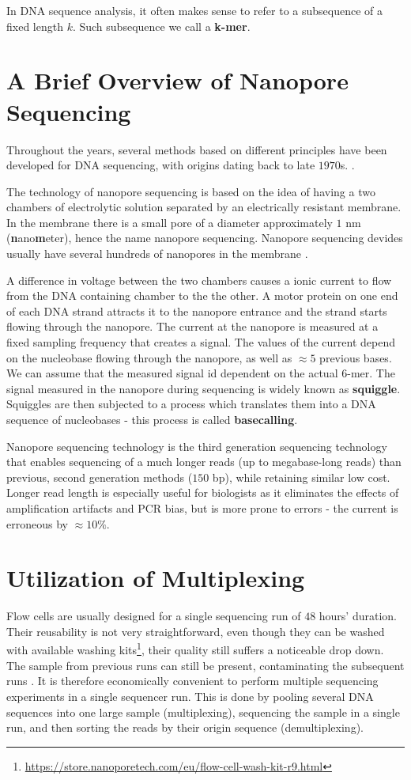 In DNA sequence analysis, it often makes sense to refer to a subsequence of a fixed length \(k\). Such subsequence we call a \textbf{k-mer}.

\section{A Brief Overview of Nanopore Sequencing}
Throughout the years, several methods based on different principles have been developed for DNA sequencing, with origins dating back to late $1970$s.  \cite{ambardar2016high}.

The technology of nanopore sequencing is based on the idea of having a two chambers of electrolytic solution separated by an electrically resistant membrane. In the membrane there is a small pore of a diameter approximately $1$ nm (\textbf{n}ano\textbf{m}eter), hence the name nanopore sequencing. Nanopore sequencing devides usually have several hundreds of nanopores in the membrane \cite{ambardar2016high}.

A difference in voltage between the two chambers causes a ionic current to flow from the DNA containing chamber to the the other. A motor protein on one end of each DNA strand attracts it to the nanopore entrance and the strand starts flowing through the nanopore. The current at the nanopore is measured at a fixed sampling frequency that creates a signal. The values of the current depend on the nucleobase flowing through the nanopore, as well as $\approx 5$ previous bases. We can assume that the measured signal id dependent on the actual $6$-mer. The signal measured in the nanopore during sequencing is widely known as \textbf{squiggle}. Squiggles are then subjected to a process which translates them into a DNA sequence of nucleobases - this process is called \textbf{basecalling}.

Nanopore sequencing technology is the third generation sequencing technology that enables sequencing of a much longer reads (up to megabase-long reads) than previous, second generation methods ($150$ bp), while retaining similar low cost. Longer read length is especially useful for biologists as it eliminates the effects of amplification artifacts and PCR bias, but is more prone to errors - the current is erroneous by $\approx 10\%$.


\section{Utilization of Multiplexing}
Flow cells are usually designed for a single sequencing run of $48$ hours' duration. Their reusability is not very straightforward, even though they can be washed with available washing kits\footnote{\url{https://store.nanoporetech.com/eu/flow-cell-wash-kit-r9.html}}, their quality still suffers a noticeable drop down. The sample from previous runs can still be present, contaminating the subsequent runs \cite{storeONT}. It is therefore economically convenient to perform multiple sequencing experiments in a single sequencer run.
This is done by pooling several DNA sequences into one large sample (multiplexing), sequencing the sample in a single run, and then sorting the reads by their origin sequence (demultiplexing).

